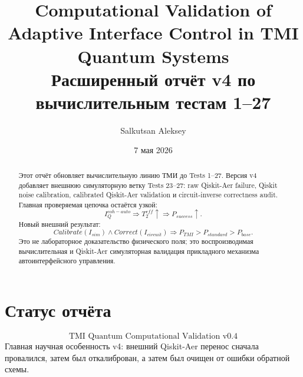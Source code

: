 \documentclass[12pt,a4paper]{article}
\title{\textbf{Computational Validation of Adaptive Interface Control in TMI Quantum Systems}\\\large Расширенный отчёт v4 по вычислительным тестам 1--27}
\author{Salkutsan Aleksey}\date{7 мая 2026}
\begin{document}
\maketitle
\begin{abstract}
Этот отчёт обновляет вычислительную линию ТМИ до Tests 1--27. Версия v4 добавляет внешнюю симуляторную ветку Tests 23--27: raw Qiskit-Aer failure, Qiskit noise calibration, calibrated Qiskit-Aer validation и circuit-inverse correctness audit. Главная проверяемая цепочка остаётся узкой:
\[I_Q^{coh-auto}\Rightarrow T_2^{eff}\uparrow\Rightarrow P_{success}\uparrow.\]
Новый внешний результат:
\[Calibrate(I_{sim})\land Correct(I_{circuit})\Rightarrow P_{TMI}>P_{standard}>P_{base}.\]
Это не лабораторное доказательство физического поля; это воспроизводимая вычислительная и Qiskit-Aer симуляторная валидация прикладного механизма автоинтерфейсного управления.
\end{abstract}\tableofcontents\newpage
\section{Статус отчёта}
\[\boxed{\text{TMI Quantum Computational Validation v0.4}}\]
Главная научная особенность v4: внешний Qiskit-Aer перенос сначала провалился, затем был откалиброван, а затем был очищен от ошибки обратной схемы.
\end{document}
